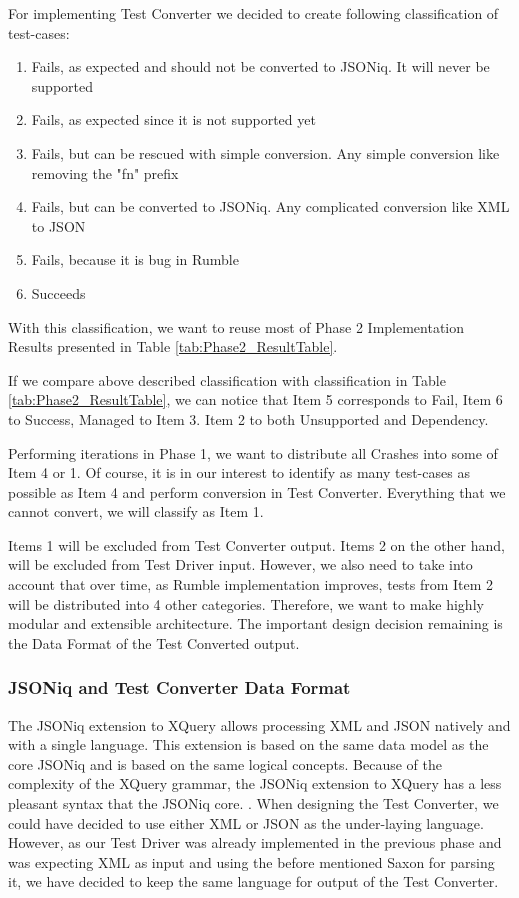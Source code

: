 For implementing Test Converter we decided to create following classification of test-cases:
\begin{enumerate}
	\item Fails, as expected and should not be converted to JSONiq. It will never be supported
	\item Fails, as expected since it is not supported yet
	\item Fails, but can be rescued with simple conversion. Any simple conversion like removing the "fn" prefix 
	\item Fails, but can be converted to JSONiq. Any complicated conversion like XML to JSON
	\item Fails, because it is bug in Rumble
	\item Succeeds
\end{enumerate}

With this classification, we want to reuse most of Phase 2 Implementation Results presented in Table \ref{tab:Phase2_ResultTable}.

If we compare above described classification with classification in Table \ref{tab:Phase2_ResultTable}, we can notice that Item 5 corresponds to Fail, Item 6 to Success, Managed to Item 3. Item 2 to both Unsupported and Dependency. 

Performing iterations in Phase 1, we want to distribute all Crashes into some of Item 4 or 1. Of course, it is in our interest to identify as many test-cases as possible as Item 4 and perform conversion in Test Converter. Everything that we cannot convert, we will classify as Item 1. 

Items 1 will be excluded from Test Converter output. Items 2 on the other hand, will be excluded from Test Driver input. However, we also need to take into account that over time, as Rumble implementation improves, tests from Item 2 will be distributed into 4 other categories. Therefore, we want to make highly modular and extensible architecture. The important design decision remaining is the Data Format of the Test Converted output.

\subsubsection{JSONiq and Test Converter Data Format}
The JSONiq extension to XQuery allows processing XML and JSON natively and with a single language. This extension is based on the same data model as the core JSONiq and is based on the same logical concepts. Because of the complexity of the XQuery grammar, the JSONiq extension to XQuery has a less pleasant syntax that the JSONiq core. . When designing the Test Converter, we could have decided to use either XML or JSON as the under-laying language. However, as our Test Driver was already implemented in the previous phase and was expecting XML as input and using the before mentioned Saxon for parsing it, we have decided to keep the same language for output of the Test Converter. 

